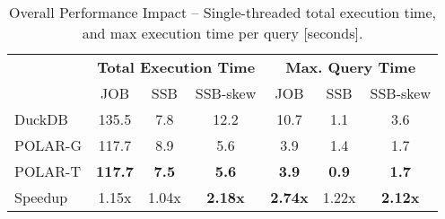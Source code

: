 \begin{table}
	\centering
	\caption{Overall Performance Impact -- Single-threaded total execution time, and max execution time per query [seconds].}
		\vspace{-0.3cm} \setlength\tabcolsep{3.7pt}
   \begin{tabular}{lcccccc}
	  \toprule
		& \multicolumn{3}{c}{\textbf{Total Execution Time}} & \multicolumn{3}{c}{\textbf{Max. Query Time}}\\
         & JOB & SSB & SSB-skew & JOB & SSB & SSB-skew\\
		\midrule
		DuckDB & 135.5 & 7.8 & 12.2 & 10.7 & 1.1 & 3.6\\
        POLAR-G & 117.7 & 8.9 & 5.6 & 3.9 & 1.4 & 1.7\\
        POLAR-T & \textbf{117.7} & \textbf{7.5} & \textbf{5.6} & \textbf{3.9} & \textbf{0.9} & \textbf{1.7} \\
        Speedup & 1.15x & 1.04x & \textbf{\color{red}2.18x} & \textbf{\color{red}2.74x} & 1.22x & \textbf{\color{red}2.12x}\\
		\bottomrule
	\end{tabular}
	\label{tab:3_4_endtoend}
\end{table}
